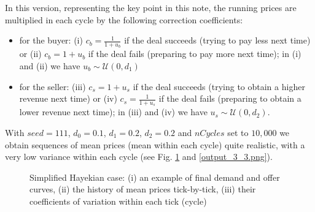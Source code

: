 \documentclass[10pt]{report}
\begin{document}
In this version, representing the key point in this note, the running prices are multiplied in each cycle by the following  correction coefficients:

\begin{itemize}
\item for the buyer: (i) $c_b=\frac{1} {1 + u_b}$ if the deal succeeds (trying to pay less next time) or (ii) $c_b=1 + u_b$ if the deal fails (preparing to pay more next time); in (i) and (ii) we have $u_b\sim\mathcal{U}(0,d_1)$

\item for the seller: (iii) $c_s=1 + u_s$ if the deal succeeds (trying to obtain a higher revenue next time) or (iv) $c_s=\frac{1} {1 + u_s}$  if the deal fails (preparing to obtain a lower revenue next time); in (iii) and (iv) we have $u_s\sim\mathcal{U}(0,d_2)$.
\end{itemize}

With $seed=111$,  $d_0=0.1$, $d_1=0.2$, $d_2=0.2$ and $nCycles$ set to $10,000$ we obtain sequences of mean prices (mean within each cycle) quite realistic, with a very low variance within each cycle (see Fig. \ref{output_3_2.png} and \ref{output_3_3.png}).

\begin{figure}[H]
\begin{center}
\caption{Simplified Hayekian case: (i) an example of final demand and offer curves, (ii) the history of mean prices tick-by-tick, (iii) their coefficients of variation within each tick (cycle)}
\label{output_3_2.png}
\end{center}
\end{figure}
\end{document}
